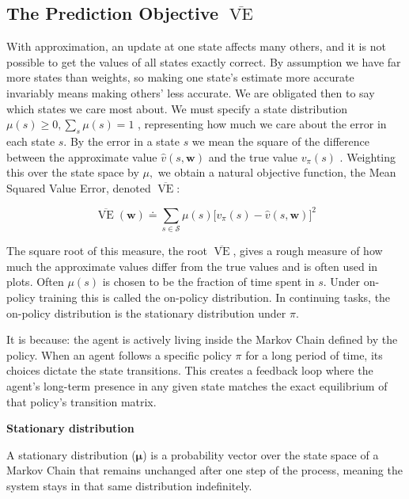 \documentclass{article}
\begin{document}
\subsection{The Prediction Objective \texorpdfstring{$\overline { { \operatorname { V E } } }$}{}}

With approximation, an update at one state affects many others, and it is not possible to get the values of all states exactly correct. By assumption we have far more states than weights, so making one state's estimate 
more accurate invariably means making others' less accurate. We are obligated then to say which states we care most about. We must specify a state distribution $\mu ( s ) \geq 0 , \sum _ { s } \mu ( s ) = 1$ , 
representing how much we care about the error in each state $s$. By the error in a state $s$ we mean the square of the difference between the approximate value $\hat { v } ( s ,   \mathbf { w } )$ 
and the true value $v _ { \pi } ( s )$ . Weighting this over the state space by $\mu ,$ we obtain a natural objective function, the Mean Squared Value Error, denoted $\overline { { \operatorname { V E } } }$:

$$
\overline { { \operatorname { V E } } } ( \mathbf { w } ) \doteq \sum _ { s \in \mathcal { S } } \mu ( s ) \Big [ v _ { \pi } ( s ) - \hat { v } ( s \mathbf { , } \mathbf { w } ) \Big ] ^ { 2 }
$$

The square root of this measure, the root $\overline { { \operatorname { V E } } }$, gives a rough measure of how much the approximate values differ from the true values and is often used in plots. Often $\mu ( s )$ is chosen to be the fraction of time spent in $s$. 
Under on-policy training this is called the on-policy distribution. In continuing tasks, the on-policy distribution is the stationary distribution under $\pi$.

It is because: the agent is actively living inside the Markov Chain defined by the policy. When an agent follows a specific policy \(\pi \) for a long period of time, its choices dictate the state transitions. This creates a feedback loop where the agent's long-term presence 
in any given state matches the exact equilibrium of that policy's transition matrix.

\textbf{Stationary distribution}

A stationary distribution ($\pmb { \mu }$) is a probability vector over the state space of a Markov Chain that remains unchanged after one step of the process, meaning the system stays in that same distribution indefinitely.
\end{document}
